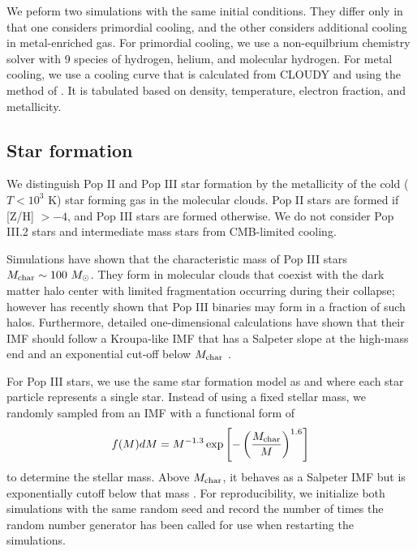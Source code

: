 \documentclass[apjl]{emulateapj}
\begin{document}
We peform two simulations with the same initial conditions.  They
differ only in that one considers primordial cooling, and the other
considers additional cooling in metal-enriched gas.  For primordial
cooling, we use a non-equilbrium chemistry solver with 9 species of
hydrogen, helium, and molecular hydrogen.  For metal cooling, we use a
cooling curve that is calculated from CLOUDY \citep{ref} and using the
method of \citet{2008MNRAS.385.1443S}.  It is tabulated based on
density, temperature, electron fraction, and metallicity.

\subsection{Star formation}

We distinguish Pop II and Pop III star formation by the metallicity of
the cold ($T < 10^3$ K) star forming gas in the molecular clouds.  Pop
II stars are formed if [Z/H] $> -4$, and Pop III stars are formed
otherwise.  We do not consider Pop III.2 stars and intermediate mass
stars from CMB-limited cooling.

Simulations have shown that the characteristic mass of Pop III stars
$M_{\rm char} \sim 100~\Ms$.  They form in molecular clouds that
coexist with the dark matter halo center with limited fragmentation
occurring during their collapse; however \citet{2009Sci...325..601T}
has recently shown that Pop III binaries may form in a fraction of
such halos.  Furthermore, detailed one-dimensional calculations have
shown that their IMF should follow a Kroupa-like IMF that has a
Salpeter slope at the high-mass end and an exponential cut-off below
$M_{\rm char}$ \citep{refs}.

For Pop III stars, we use the same star formation model as
\citet{Abel07} and \citet{Wise08_Gal} where each star particle
represents a single star.  Instead of using a fixed stellar mass, we
randomly sampled from an IMF with a functional form of
%
\begin{equation}
\label{eqn:imf}
f(M)dM = M^{-1.3} \exp\left[-\left(\frac{M_{\rm char}}{M}\right)^{1.6}\right]
\end{equation}
%
to determine the stellar mass.  Above $M_{\rm char}$, it behaves as a
Salpeter IMF but is exponentially cutoff below that mass
\citep{Chabrier03, Clark09}.  For reproducibility, we initialize both
simulations with the same random seed and record the number of times
the random number generator \citep[Mersenne twister;][]{ref} has been
called for use when restarting the simulations.
\end{document}
